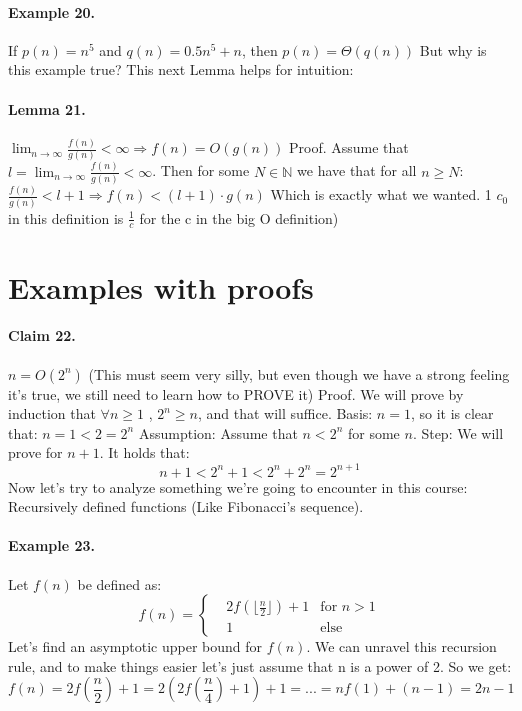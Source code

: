 \paragraph{Example 20.} If \(p(n) = n^5\) and \(q(n) = 0.5n^5 + n\), then \(p(n) = \Theta(q(n))\)
But why is this example true? This next Lemma helps for intuition:
\paragraph{Lemma 21.} \( \lim_{n \rightarrow \infty} \frac{f(n)}{g(n)} < \infty \Rightarrow f(n) = O(g(n)) \)
Proof. Assume that \(l = \lim_{n \rightarrow \infty} \frac{f(n)}{g(n)} < \infty\). Then for some \(N \in \mathbb{N}\) we have that for all \(n \ge N\):
\( \frac{f(n)}{g(n)} < l + 1 \Rightarrow f(n) < (l + 1) · g(n) \)
Which is exactly what we wanted.
1
\(c_0\)
in this definition is \(\frac{1}{c}\) for the c in the big O definition)

\section{Examples with proofs}

\paragraph{Claim 22.} \(n = O(2^n)\)
(This must seem very silly, but even though we have a strong feeling it’s true, we still need to learn how to PROVE it)
Proof. We will prove by induction that \( \forall n \ge 1 \) , \(2^n \ge n\), and that will suffice.
Basis: \(n = 1\), so it is clear that: \(n = 1 < 2 = 2^n\)
Assumption: Assume that \(n < 2^n\) for some \(n\).
Step: We will prove for \(n + 1\). It holds that:
\begin{equation*}
n + 1 < 2^{n} + 1 < 2^n + 2^n = 2^{n+1}
\end{equation*}
Now let’s try to analyze something we’re going to encounter in this course: Recursively defined functions (Like Fibonacci’s
sequence).
\paragraph{Example 23.} Let \(f(n)\) be defined as:
\begin{equation*}
f(n) = \left\{ \begin{array}{rcl}
& 2f\left( \lfloor  \frac{n}{2} \rfloor \right) + 1 & \mbox{for }  n > 1  \\
& 1 & \mbox{else}  
\end{array}\right.
\end{equation*}
Let’s find an asymptotic upper bound for \(f(n)\).
We can unravel this recursion rule, and to make things easier let’s just assume that n is a power of 2. So we get:
    \begin{equation*}
    f(n) = 2f\left(\frac{n}{2}\right) + 1 =2\left(2f\left(\frac{n}{4}\right) + 1\right) + 1 = ... = nf(1)+ \left( n -1 \right) = 2n-1
    \end{equation*}

